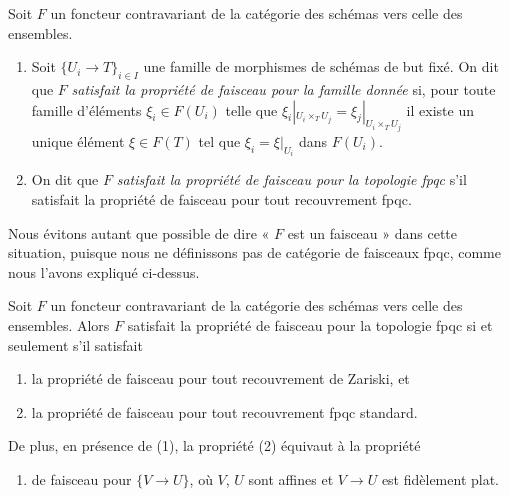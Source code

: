 \begin{definition}
\label{definition-sheaf-property-fpqc}
Soit $F$ un foncteur contravariant de la catégorie
des schémas vers celle des ensembles.
\begin{enumerate}
\item Soit $\{U_i \to T\}_{i \in I}$ une famille de morphismes
de schémas de but fixé.
On dit que $F$ {\it satisfait la propriété de faisceau pour la famille donnée}
si, pour toute famille d'éléments $\xi_i \in F(U_i)$ telle que
$\xi_i|_{U_i \times_T U_j} = \xi_j|_{U_i \times_T U_j}$
il existe un unique élément
$\xi \in F(T)$ tel que $\xi_i = \xi|_{U_i}$ dans $F(U_i)$.
\item On dit que $F$ {\it satisfait la propriété de faisceau pour la
topologie fpqc} s'il satisfait la propriété de faisceau pour tout
recouvrement fpqc.
\end{enumerate}
\end{definition}

\noindent
Nous évitons autant que possible de dire « $F$ est un faisceau » dans cette
situation, puisque nous ne définissons pas de catégorie de faisceaux fpqc,
comme nous l'avons expliqué ci-dessus.

\begin{lemma}
\label{lemma-sheaf-property-fpqc}
Soit $F$ un foncteur contravariant de la catégorie
des schémas vers celle des ensembles. Alors $F$ satisfait
la propriété de faisceau pour la topologie fpqc si et seulement
s'il satisfait
\begin{enumerate}
\item la propriété de faisceau pour tout recouvrement de Zariski, et
\item la propriété de faisceau pour tout recouvrement fpqc standard.
\end{enumerate}
De plus, en présence de (1), la propriété (2) équivaut à la
propriété
\begin{enumerate}
\item[(2')] de faisceau pour $\{V \to U\}$,
où $V$, $U$ sont affines et $V \to U$ est fidèlement plat.
\end{enumerate}
\end{lemma}

